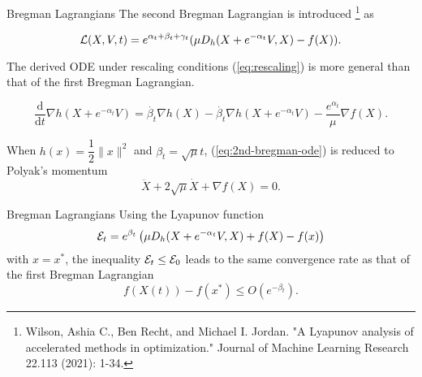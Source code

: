 \begin{frame}{Bregman Lagrangians}
  The second Bregman Lagrangian is introduced \footnote{Wilson, Ashia C., Ben Recht, and Michael I. Jordan. "A Lyapunov analysis of accelerated methods in optimization." Journal of Machine Learning Research 22.113 (2021): 1-34.} as

  \begin{equation}
    \mathcal{L}(X,V,t) = e^{\alpha_t+\beta_t+\gamma_t}(\mu D_h(X+e^{-\alpha_t}V, X)- f(X)).
  \end{equation}

  The derived ODE under rescaling conditions (\ref{eq:rescaling}) is more general than that of the first Bregman Lagrangian.

  \begin{equation}
    \label{eq:2nd-bregman-ode}
    \dfrac{\mathrm{d}}{\mathrm{d}t}\nabla h(X + e^{-\alpha_t}V) = \dot{\beta_t}\nabla h(X) - \dot{\beta_t}\nabla h(X + e^{-\alpha_t}V) -\dfrac{e^{\alpha_t}}{\mu}\nabla f(X).
  \end{equation}

  When $h(x)=\dfrac{1}{2}\|x\|^2$ and $\beta_t = \sqrt{\mu}t$, (\ref{eq:2nd-bregman-ode}) is reduced to Polyak's momentum
  $$\ddot{X} + 2\sqrt{\mu}\dot{X} + \nabla f(X) = 0.$$
\end{frame}

\begin{frame}{Bregman Lagrangians}
  Using the Lyapunov function
  \begin{equation}
    \mathcal{E}_t = e^{\beta_t}\left(\mu D_h(X+e^{-\alpha_t}V, X) + f(X) - f(x)\right)
  \end{equation}
  with $x=x^*$, the inequality $\mathcal{E}_t\le \mathcal{E}_0$ leads to the same convergence rate as that of the first Bregman Lagrangian
  $$f(X(t)) - f(x^*) \le O(e^{-\beta_t}).$$
\end{frame}